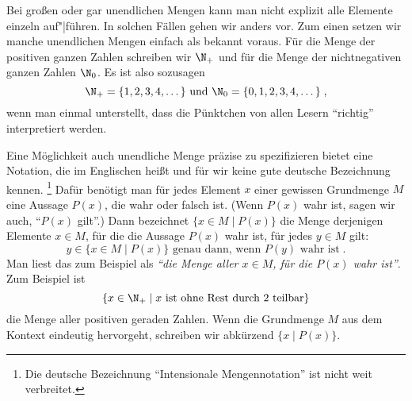 Bei großen oder gar unendlichen Mengen kann man nicht explizit alle
Elemente einzeln auf"|führen.
%
In solchen Fällen gehen wir anders vor.
%
Zum einen setzen wir manche unendlichen Mengen einfach als bekannt voraus.
%
Für die Menge der positiven ganzen Zahlen schreiben wir $\N_+$ und für
die Menge der nichtnegativen ganzen Zahlen $\N_0$.
%
Es ist also sozusagen
\[
  \N_+ = \{ 1, 2, 3, 4, \dots \} \text{ und }
  \N_0 = \{ 0, 1, 2, 3, 4, \dots \} \;,
\]
wenn man einmal unterstellt, dass die Pünktchen von allen Lesern
"`richtig"' interpretiert werden.

Eine Möglichkeit auch unendliche Menge präzise zu spezifizieren bietet
eine Notation, die im Englischen  heißt und
für wir keine gute deutsche Bezeichnung
kennen.%
\footnote{Die deutsche Bezeichnung "`Intensionale Mengennotation"' ist nicht weit verbreitet.}
%
Dafür benötigt man für jedes Element $x$ einer gewissen Grundmenge
$M$ eine Aussage $P(x)$, die wahr oder falsch ist.
%
(Wenn $P(x)$ wahr ist, sagen wir auch, "`$P(x)$ gilt"'.)
%
Dann bezeichnet $\{ x\in M \mid P(x) \}$ die Menge derjenigen Elemente
$x\in M$, für die die Aussage $P(x)$ wahr ist, \dh für jedes $y\in M$
gilt:
\[
  y \in \{ x \in M \mid P(x) \} \text{ genau dann, wenn } P(y) \text{ wahr ist} \;.
\]
%
Man liest das zum Beispiel als \emph{"`die Menge aller $x \in M$, für die
  $P(x)$ wahr ist"'}.
%
Zum Beispiel ist
\[
  \{ x \in \N_+ \mid \text{$x$ ist ohne Rest durch $2$ teilbar} \}
\]
die Menge aller positiven geraden Zahlen.
%
Wenn die Grundmenge $M$ aus dem Kontext eindeutig hervorgeht, schreiben wir abkürzend
$\{x\mid P(x)\}$.

